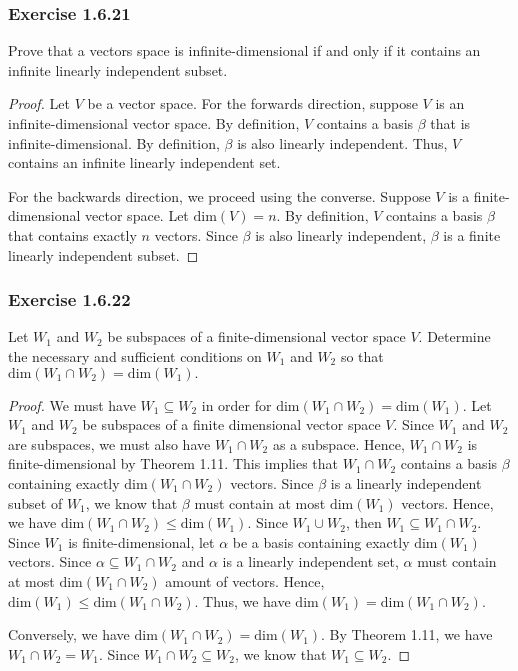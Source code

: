 \subsubsection{Exercise 1.6.21} Prove that a vectors space is infinite-dimensional if and only if it contains an infinite linearly independent subset. 
\begin{proof}
Let \( V  \) be a vector space. For the forwards direction, suppose \( V  \) is an infinite-dimensional vector space. By definition, \( V  \) contains a basis \( \beta \) that is infinite-dimensional. By definition, \( \beta \) is also linearly independent. Thus, \( V \) contains an infinite linearly independent set. 

For the backwards direction, we proceed using the converse. Suppose \( V  \) is a finite-dimensional vector space. Let \( \text{dim}(V) = n  \). By definition, \( V  \) contains a basis \( \beta \) that contains exactly \( n  \) vectors. Since \( \beta \) is also linearly independent, \( \beta \) is a finite linearly independent subset.
\end{proof}


\subsubsection{Exercise 1.6.22} Let \( W_{1} \) and \( W_{2} \) be subspaces of a finite-dimensional vector space \( V  \). Determine the necessary and sufficient conditions on \( W_{1}  \) and \( W_{2} \) so that \( \text{dim}(W_{1} \cap W_{2}) = \text{dim}(W_{1}). \)    
\begin{proof}
We must have \( W_{1} \subseteq W_{2}  \) in order for \( \text{dim}(W_{1} \cap W_{2}) = \text{dim}(W_{1}) \). Let \( W_{1}  \) and \( W_{2} \) be subspaces of a finite dimensional vector space \( V  \). Since \( W_{1}  \) and \( W_{2}  \) are subspaces, we must also have \( W_{1} \cap W_{2} \) as a subspace. Hence, \( W_{1} \cap W_{2}  \) is finite-dimensional by Theorem 1.11. This implies that \( W_{1} \cap W_{2}  \) contains a basis \( \beta \) containing exactly \( \text{dim}(W_{1} \cap W_{2}) \) vectors. Since \( \beta \) is a linearly independent subset of \( W_{1} \), we know that \( \beta \) must contain at most \( \text{dim}(W_{1}) \) vectors. Hence, we have \( \text{dim}(W_{1} \cap W_{2}) \leq \text{dim}(W_{1}) \). Since \( W_{1} \cup W_{2} \), then \( W_{1} \subseteq W_{1} \cap W_{2} \). Since \( W_{1} \) is finite-dimensional, let \( \alpha \) be a basis containing exactly \( \text{dim}(W_{1})  \) vectors. Since \( \alpha \subseteq W_{1} \cap W_{2} \) and \( \alpha \) is a linearly independent set, \( \alpha  \) must contain at most \( \text{dim}(W_{1} \cap W_{2}) \) amount of vectors. Hence, \( \text{dim}(W_{1}) \leq \text{dim}(W_{1} \cap W_{2}) \). Thus, we have \( \text{dim}(W_{1}) = \text{dim}(W_{1} \cap W_{2}) \).

Conversely, we have \( \text{dim}(W_{1} \cap W_{2}) = \text{dim}(W_{1}) \). By Theorem 1.11, we have \( W_{1} \cap W_{2} = W_{1} \). Since \( W_{1} \cap W_{2} \subseteq W_{2} \), we know that \( W_{1} \subseteq W_{2} \).  
\end{proof}

